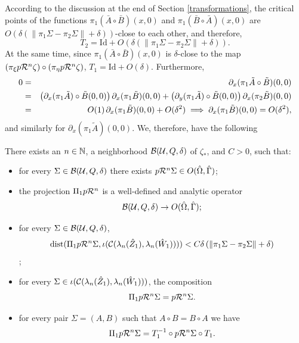 According to the discussion at the end of Section \ref{transformations}, the critical points  of the functions $\pi_1 (\bar A \circ \bar B)(x,0)$ and $\pi_1 (\bar B \circ \bar A)(x,0)$ are $O\left( \delta \left( \|\pi_1 \Sigma -\pi_2 \Sigma \|  +\delta \right) \right)$-close to each other, and therefore, 
\begin{equation}
\label{T2small} T_2=\text{Id}+O\left( \delta \left( \|\pi_1 \Sigma -\pi_2 \Sigma \|  +\delta \right) \right).
\end{equation}
At the same time, since $\pi_1 (\bar A \circ \bar B)(x,0)$  is $\delta$-close to the map $(\pi_\xi p \mathcal{R}^n \zeta) \circ (\pi_\eta p \mathcal{R}^n \zeta)$, $T_1=\text{Id}+O\left( \delta \right)$. Furthermore,  
\begin{eqnarray}
\nonumber 0&=&\partial_x (\pi_1 \tilde A \circ \tilde B)(0,0)\\
\nonumber &=&\left( \partial_x (\pi_1 \tilde A) \circ \tilde B(0,0)\right)  \partial_x (\pi_1 \tilde B)(0,0)+\left( \partial_y (\pi_1 \tilde A) \circ \tilde B(0,0) \right) \partial_x (\pi_2 \tilde B)(0,0) \\
\nonumber &=&O(1) \hspace{0.5mm} \partial_x (\pi_1 \tilde B)(0,0) + O(\delta^2) \implies  \partial_x (\pi_1 \tilde B)(0,0)=O(\delta^2),
\end{eqnarray}
and similarly for $ \partial_x (\pi_1 \tilde A)(0,0)$. We, therefore, have the following
\begin{lem}
\label{lem-proj1}
There exists an $n \in {\Bbb N}$, a neighborhood $\mathcal{B}(\mathcal{U},Q,\delta)$ of $\zeta_*$, and $C>0$, such that:
\begin{itemize}
\item for every $\Sigma \in \mathcal{B}(\mathcal{U},Q,\delta)$ there exists $p\mathcal{R}^n\Sigma\in O(\hat\Omega,\hat\Gamma)$;
\item the projection $\Pi_1 p\mathcal{R}^n$ is a  well-defined and analytic operator  $$\mathcal{B}(\mathcal{U},Q,\delta)\to O(\hat\Omega,\hat\Gamma);$$
\item for every $\Sigma \in \mathcal{B}(\mathcal{U},Q,\delta)$,
$${\rm dist} { ( }\Pi_1 p \mathcal{R}^n \Sigma, \iota(\mathcal{C}(\lambda_n(\hat Z_1),\lambda_n(\hat W_1))))<C \delta \left( \|\pi_1 \Sigma -\pi_2 \Sigma \|  +\delta \right)$$;
\item for every $\Sigma \in \iota(\mathcal{C}(\lambda_n(\hat Z_1),\lambda_n(\hat W_1)))$, the composition
$$\Pi_1 p \mathcal{R}^n \Sigma =p \mathcal{R}^n \Sigma.$$
\item for every  pair $\Sigma=(A,B)$ such that $A\circ B=B\circ A$ we have
$$\Pi_1 p \mathcal{R}^n \Sigma =T_1^{-1} \circ  p \mathcal{R}^n \Sigma \circ T_1.$$
\end{itemize}
\end{lem}


